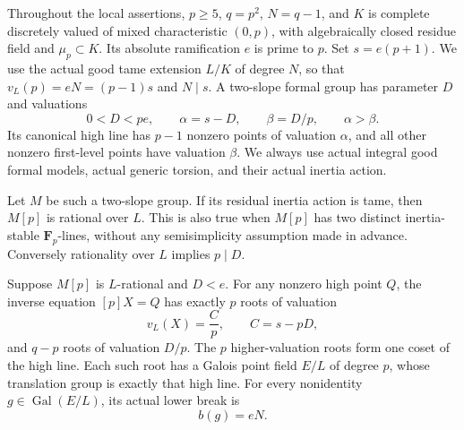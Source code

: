 Throughout the local assertions, \(p\ge5\), \(q=p^2\), \(N=q-1\),
and \(K\) is complete discretely valued of mixed characteristic
\((0,p)\), with algebraically closed residue field and \(\mu_p\subset K\).
Its absolute ramification \(e\) is prime to \(p\). Set \(s=e(p+1)\).
We use the actual good tame extension \(L/K\) of degree \(N\),
so that \(v_L(p)=eN=(p-1)s\) and \(N\mid s\).
A two-slope formal group has parameter \(D\) and valuations
\[
 0<D<pe,\qquad \alpha=s-D,\qquad\beta=D/p,
 \qquad \alpha>\beta.
 \tag{B-RD73.1}
\]
Its canonical high line has \(p-1\) nonzero points of valuation
\(\alpha\), and all other nonzero first-level points have valuation
\(\beta\). We always use actual integral good formal models,
actual generic torsion, and their actual inertia action.

\begin{lemma}
\label{lem:B-RD73-high-branch}
Let \(M\) be such a two-slope group. If its residual inertia action
is tame, then \(M[p]\) is rational over \(L\).
This is also true when \(M[p]\) has two distinct inertia-stable
\(\mathbf F_p\)-lines, without any semisimplicity assumption made
in advance. Conversely rationality over \(L\) implies \(p\mid D\).

Suppose \(M[p]\) is \(L\)-rational and \(D<e\).
For any nonzero high point \(Q\), the inverse equation \([p]X=Q\)
has exactly \(p\) roots of valuation
\[
 v_L(X)=\frac{C}{p},\qquad C=s-pD,
 \tag{B-RD73.2}
\]
and \(q-p\) roots of valuation \(D/p\).
The \(p\) higher-valuation roots form one coset of the high line.
Each such root has a Galois point field \(E/L\) of degree \(p\),
whose translation group is exactly that high line.
For every nonidentity \(g\in\operatorname{Gal}(E/L)\), its actual
lower break is
\[
 b(g)=eN.
 \tag{B-RD73.3}
\]
\end{lemma}
